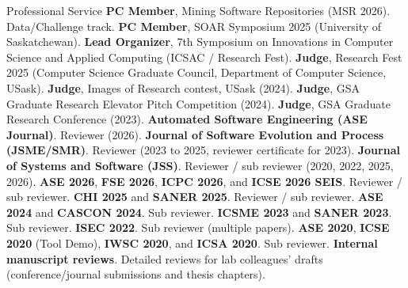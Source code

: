\begin{rubric}{Professional Service}
\entry*[PC]%
	\textbf{PC Member}, Mining Software Repositories ({MSR} 2026). Data/Challenge track.
	\textbf{PC Member}, SOAR Symposium 2025 (University of Saskatchewan).
\vspace{-1mm}
\entry*[Org]%
	\textbf{Lead Organizer}, 7th Symposium on Innovations in Computer Science and Applied Computing ({ICSAC} / Research Fest).
	\textbf{Judge}, Research Fest 2025 (Computer Science Graduate Council, Department of Computer Science, USask).
	\textbf{Judge}, Images of Research contest, USask (2024).
	\textbf{Judge}, GSA Graduate Research Elevator Pitch Competition (2024).
	\textbf{Judge}, GSA Graduate Research Conference (2023).
\vspace{-1mm}
\entry*[Journals]%
	\textbf{Automated Software Engineering (ASE Journal)}. Reviewer (2026).
	\textbf{Journal of Software Evolution and Process (JSME/SMR)}. Reviewer (2023 to 2025, reviewer certificate for 2023).
	\textbf{Journal of Systems and Software (JSS)}. Reviewer / sub reviewer (2020, 2022, 2025, 2026).
\vspace{-1mm}
\entry*[2026]%
	\textbf{ASE 2026}, \textbf{FSE 2026}, \textbf{ICPC 2026}, and \textbf{ICSE 2026 SEIS}. Reviewer / sub reviewer.
\vspace{-1mm}
\entry*[2025]%
	\textbf{CHI 2025} and \textbf{SANER 2025}. Reviewer / sub reviewer.
\vspace{-1mm}
\entry*[2024]%
	\textbf{ASE 2024} and \textbf{CASCON 2024}. Sub reviewer.
\vspace{-1mm}
\entry*[2023]%
	\textbf{ICSME 2023} and \textbf{SANER 2023}. Sub reviewer.
\vspace{-1mm}
\entry*[2022]%
	\textbf{ISEC 2022}. Sub reviewer (multiple papers).
\vspace{-1mm}
\entry*[2020]%
	\textbf{ASE 2020}, \textbf{ICSE 2020} (Tool Demo), \textbf{IWSC 2020}, and \textbf{ICSA 2020}. Sub reviewer.
\vspace{-1mm}
\entry*[Internal]%
	\textbf{Internal manuscript reviews}. Detailed reviews for lab colleagues' drafts (conference/journal submissions and thesis chapters).
\end{rubric}

